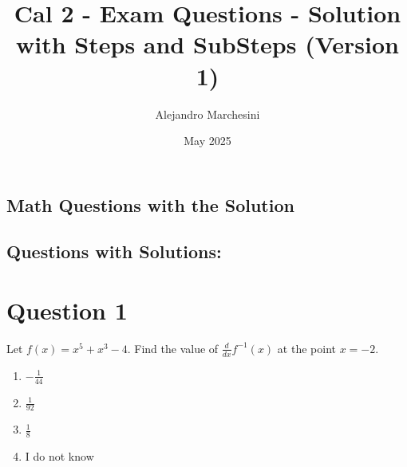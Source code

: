 \documentclass{article}
\title{\textbf{Cal 2 - Exam Questions - Solution with Steps and SubSteps (Version 1) }}
\author{Alejandro Marchesini}
\date{May 2025}
\begin{document}
\maketitle

\begin{center}
    \section*{Math Questions with the Solution}  
\end{center}

\subsection*{Questions with Solutions:}

    \section*{Question 1}
    Let $f(x) = x^5 + x^3 - 4$. Find the value of $\frac{d}{dx}f^{-1}(x)$ at the point $x = -2$.  
    
    \begin{enumerate}[label = \alph*.]
        \item $-\frac{1}{44}$
        \item $\frac{1}{92}$
        \item $\frac{1}{8}$
        \item I do not know
    \end{enumerate}
\end{document}
